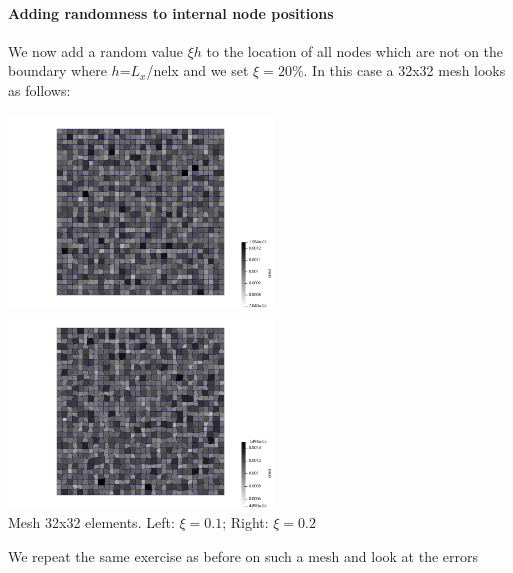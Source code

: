 \newpage
\paragraph{Adding randomness to internal node positions} We now add a random value $\xi h$ to the 
location of all nodes which are not on the boundary where $h$=$L_x$/nelx and we set $\xi=20\%$.
In this case a 32x32 mesh looks as follows:

\begin{center}
\includegraphics[width=7cm]{python_codes/fieldstone_12/results/rand/area_0p1}
\includegraphics[width=7cm]{python_codes/fieldstone_12/results/rand/area_0p2}\\
{\captionfont Mesh 32x32 elements. Left: $\xi=0.1$; Right: $\xi=0.2$}
\end{center}

We repeat the same exercise as before on such a mesh and look at the errors

